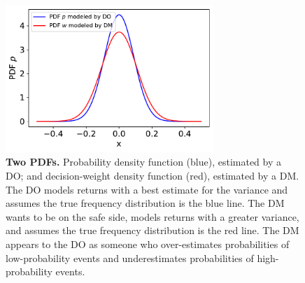 \documentclass[%
	11pt,
	abstract=true,	
	bibliography=oldstyle					%
]{scrartcl}
\newcommand{\bsf}[1]{\textsf{\textbf{#1}}}		%
\newcommand{\flabel}[1]{\label{fig:#1}}
\numberwithin{equation}{section}
\begin{document}
\begin{figure}[!htb]
\centering
\includegraphics[width=0.7\textwidth]{./figs/probability_dists.pdf}
\caption{\bsf{Two PDFs.} Probability density function (blue), estimated by a DO; and decision-weight density function (red), estimated by a DM. The DO models returns with a best estimate for the variance and assumes the true frequency distribution is the blue line. The DM wants to be on the safe side, models returns with a greater variance, and assumes the true frequency distribution is the red line. The DM appears to the DO as someone who over-estimates probabilities of low-probability events and underestimates probabilities of high-probability events.}
\flabel{probability_dists}
\end{figure}
\end{document}
